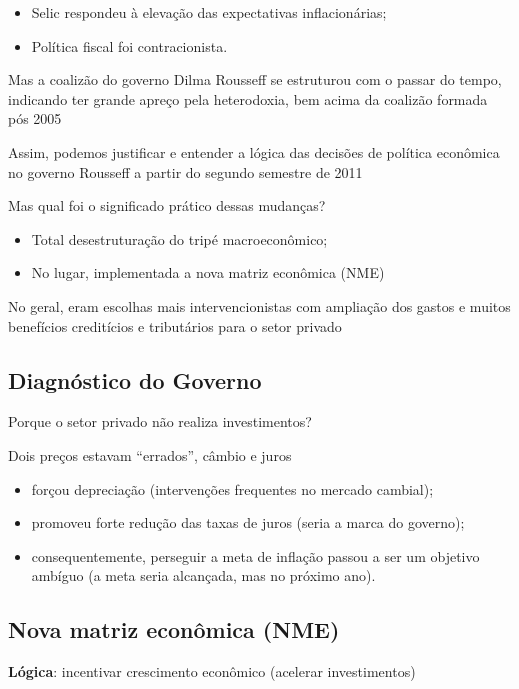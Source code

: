 \documentclass[a4paper,12pt]{article}[abntex2]
\begin{document}
\begin{itemize}
    \item Selic respondeu à elevação das expectativas inflacionárias;
    \item Política fiscal foi contracionista.
\end{itemize}

Mas a coalizão do governo Dilma Rousseff se estruturou com o passar do tempo, indicando ter grande apreço pela heterodoxia, bem acima da coalizão formada pós 2005

Assim, podemos justificar e entender a lógica das decisões de política econômica no governo Rousseff a partir do segundo semestre de 2011

Mas qual foi o significado prático dessas mudanças?

\begin{itemize}
    \item Total desestruturação do tripé macroeconômico;
    \item No lugar, implementada a nova matriz econômica (NME)
\end{itemize}

No geral, eram escolhas mais intervencionistas com ampliação dos gastos e muitos benefícios creditícios e tributários para o setor privado

\subsection{\textbf{Diagnóstico do Governo}}
Porque o setor privado não realiza investimentos?

Dois preços estavam “errados”, câmbio e juros

\begin{itemize}
    \item forçou depreciação (intervenções frequentes no mercado cambial);
    \item promoveu forte redução das taxas de juros (seria a marca do governo);
    \item consequentemente, perseguir a meta de inflação passou a ser um objetivo ambíguo (a meta seria alcançada, mas no próximo ano).
\end{itemize}

\subsection{\textbf{Nova matriz econômica (NME)}}
\textbf{Lógica}: incentivar crescimento econômico (acelerar investimentos)
\end{document}
